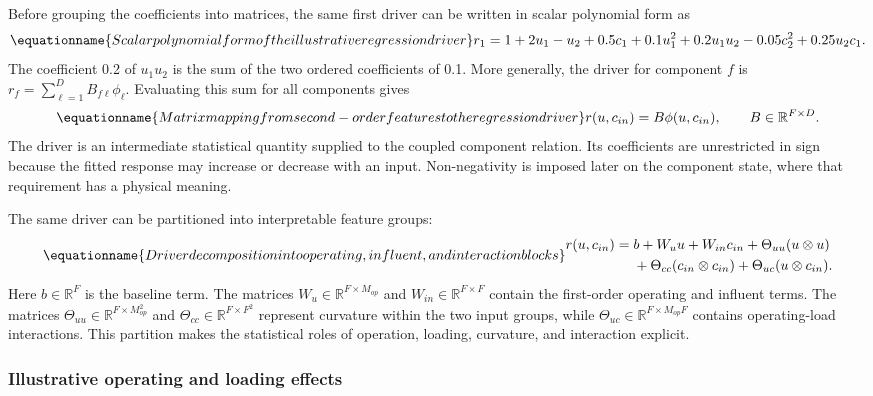 Before grouping the coefficients into matrices, the same first driver can be written in scalar polynomial form as
\begin{equation}
\equationname{Scalar polynomial form of the illustrative regression driver}
\label{eq:icsor_scalar_driver_example}
r_1=1+2u_1-u_2+0.5c_1+0.1u_1^2
+0.2u_1u_2-0.05c_2^2+0.25u_2c_1.
\end{equation}
The coefficient 0.2 of \(u_1u_2\) is the sum of the two ordered coefficients of 0.1. More generally, the driver for component \(f\) is \(r_f=\sum_{\ell=1}^{D}B_{f\ell}\phi_\ell\). Evaluating this sum for all components gives
\begin{equation}
\equationname{Matrix mapping from second-order features to the regression driver}
\label{eq:icsor_driver}
r(u,c_{in})=B\phi(u,c_{in}),
\qquad B\in\mathbb{R}^{F\times D}.
\end{equation}
The driver is an intermediate statistical quantity supplied to the coupled component relation. Its coefficients are unrestricted in sign because the fitted response may increase or decrease with an input. Non-negativity is imposed later on the component state, where that requirement has a physical meaning.

The same driver can be partitioned into interpretable feature groups:
\begin{equation}
\equationname{Driver decomposition into operating, influent, and interaction blocks}
\label{eq:icsor_driver_blocks}
\begin{aligned}
r(u,c_{in})={}&b+W_u u+W_{in}c_{in}
+\Theta_{uu}(u\otimes u)\\
&+\Theta_{cc}(c_{in}\otimes c_{in})
+\Theta_{uc}(u\otimes c_{in}).
\end{aligned}
\end{equation}
Here \(b\in\mathbb{R}^{F}\) is the baseline term. The matrices \(W_u\in\mathbb{R}^{F\times M_{op}}\) and \(W_{in}\in\mathbb{R}^{F\times F}\) contain the first-order operating and influent terms. The matrices \(\Theta_{uu}\in\mathbb{R}^{F\times M_{op}^{2}}\) and \(\Theta_{cc}\in\mathbb{R}^{F\times F^{2}}\) represent curvature within the two input groups, while \(\Theta_{uc}\in\mathbb{R}^{F\times M_{op}F}\) contains operating-load interactions. This partition makes the statistical roles of operation, loading, curvature, and interaction explicit.

\subsubsection{Illustrative operating and loading effects}

